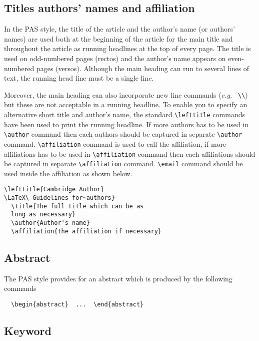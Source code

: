 \documentclass{pas}
\begin{document}
\subsection{Titles authors' names and affiliation}

In the PAS style, the title of the article and the author's name (or authors'
names) are used both at the beginning of the article for the main title and
throughout the article as running headlines at the top of every page.
The title is used on odd-numbered pages (rectos) and the author's name appears
on even-numbered pages (versos).
Although the main heading can run to several lines of text, the running head
line must be a single line.

Moreover, the main heading can also incorporate new line commands
({\it e.g.\ } \verb"\\") but these are not acceptable in a running headline.
To enable you to specify an alternative short title and author's name, the
standard \verb"\lefttitle" commands have been used to print the running headline. If more authors has to be used in \verb"\author" command then each authors should be captured in separate \verb"\author" command.
\verb"\affiliation" command is used to call the affiliation, if more affiliations has to be used in \verb"\affiliation" command then each affiliations should be captured in separate \verb"\affiliation" command.
\verb"\email" command should be used inside the affiliation as shown below.
%
\begin{verbatim}
\lefttitle{Cambridge Author}
\LaTeX\ Guidelines for~authors}
  \title{The full title which can be as 
  long as necessary}
  \author{Author's name}
  \affiliation{the affiliation if necessary}
\end{verbatim}
%

\subsection{Abstract}

The PAS style provides for an abstract which is produced by the following
commands
%
\begin{verbatim}
  \begin{abstract}  ...  \end{abstract}
\end{verbatim}

\subsection{Keyword}
\end{document}
